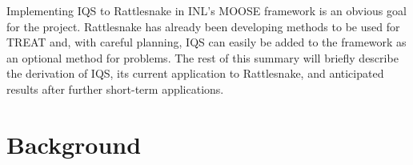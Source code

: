 \documentclass[12pt]{article}
\begin{document}
Implementing IQS to Rattlesnake in INL's MOOSE framework is an obvious goal for the project.  Rattlesnake has already been developing methods to be used for TREAT and, with careful planning, IQS can easily be added to the framework as an optional method for problems.  The rest of this summary will briefly describe the derivation of IQS, its current application to Rattlesnake, and anticipated results after further short-term applications.



%
\section{Background}
\label{sect::background}
\end{document}
